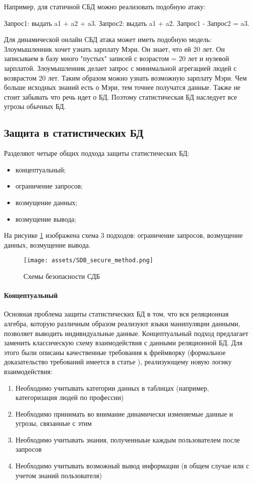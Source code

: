 Например, для статичной СБД можно реализовать подобную атаку:

Запрос1: выдать a1 + a2 + a3. Запрос2: выдать a1 + a2. Запрос1 - Запрос2 = a3.

Для динамической онлайн СБД атака может иметь подобную модель:
Злоумышленник хочет узнать зарплату Мэри. Он знает, что ей 20 лет. Он записываем в базу много "пустых" записей с возрастом = 20 лет и нулевой зарплатой. Злоумышленник делает запрос с минимальной агрегацией людей с возврастом 20 лет. Таким образом можно узнать возможную зарплату Мэри. Чем больше исходных знаний есть о Мэри, тем точнее получатся данные.
Также не стоит забывать что речь идет о БД. Поэтому статистическая БД наследует все угрозы обычных БД.

  \subsection{Защита в статистических БД}

Разделяют четыре общих подхода защиты статистических БД:
\begin{itemize}
  \item концептуальный;
	\item ограничение запросов;
	\item возмущение данных;
	\item возмущение вывода;
\end{itemize}
На рисунке \ref{fig:SDB_secure} изображена схема 3 подходов: ограничение запросов, возмущение данных, возмущение вывода.
\begin{figure}[h]
    \centering
    \texttt{[image: assets/SDB\_secure\_method.png]}
    \caption{Схемы безопасности СДБ}
    \label{fig:SDB_secure}
\end{figure}
\paragraph{Концептуальный}

Основная проблема защиты статистических БД в том, что вся реляционная алгебра, которую различным образом реализуют языки манипуляции данными, позволяет выводить индивидуальные данные. Концептуальный подход предлагает заменить классическую схему взаимодействия с данными реляционной БД. Для этого были описаны качественные требования к фреймворку (формальное доказательство требований имеется в статье \cite{LatticeModel}), реализующему новую логику взаимодействия:
\begin{enumerate}
  \item Необходимо учитывать категории данных в таблицах (например, категоризация людей по профессии)
  \item Необходимо принимать во внимание динамически изменяемые данные и угрозы, связанные с этим
  \item Необходимо учитывать знания, полученныые каждым пользователем после запросов
  \item Необходимо учитывать возможный вывод информации (в общем случае или с учетом знаний пользователя)
\end{enumerate}

